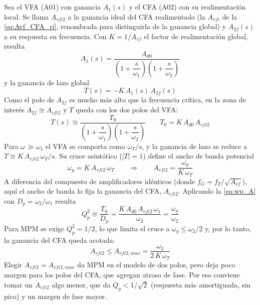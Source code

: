 Sea el VFA (A01) con ganancia $A_1(s)$ y el CFA (A02) con su realimentación local. Se llama $A_{vfi2}$ a la ganancia ideal del CFA realimentado (la $A_{vfi}$ de la \autoref{eq:Avf_CFA_ri}, renombrada para distinguirla de la ganancia global) y $A_{2f}(s)$ a su respuesta en frecuencia. Con $K = 1/A_{vf}$ el factor de realimentación global, resulta
\begin{equation}
    A_1(s) = \frac{A_{d0}}{\left(1+\dfrac{s}{\omega_1}\right)\left(1+\dfrac{s}{\omega_2}\right)}
\end{equation}
y la ganancia de lazo global
\begin{equation}
    T(s) = -K\,A_1(s)\,A_{2f}(s)
\end{equation}
Como el polo de $A_{2f}$ es mucho más alto que la frecuencia crítica, en la zona de interés $A_{2f}\cong A_{vfi2}$ y $T$ queda con los dos polos del VFA:
\begin{equation}
    T(s) \cong \frac{T_0}{\left(1+\dfrac{s}{\omega_1}\right)\left(1+\dfrac{s}{\omega_2}\right)} \qquad T_0 = K\,A_{d0}\,A_{vfi2}
\end{equation}
Para $\omega \gg \omega_1$ el VFA se comporta como $\omega_T/s$, y la ganancia de lazo se reduce a $T \cong K\,A_{vfi2}\,\omega_T/s$. Su cruce asintótico ($|T|=1$) define el ancho de banda potencial
\begin{equation}
    \omega_g = K\,A_{vfi2}\,\omega_T \qquad\Rightarrow\qquad A_{vfi2} = \frac{\omega_g}{K\,\omega_T}
    \label{eq:wg_VFACFA}
\end{equation}
A diferencia del compuesto de amplificadores idénticos (donde $f_G = f_T/\sqrt{A_{vf}}$), aquí el ancho de banda lo fija la ganancia del CFA, $A_{vfi2}$. Aplicando la \autoref{eq:wp_A} con $D_p = \omega_2/\omega_1$ resulta
\begin{equation}
    Q_p^2 \cong \frac{T_0}{D_p} = \frac{K\,A_{d0}\,A_{vfi2}\,\omega_1}{\omega_2} = \frac{\omega_g}{\omega_2}
    \label{eq:Qp_VFACFA}
\end{equation}
Para MPM se exige $Q_p^2 = 1/2$, lo que limita el cruce a $\omega_g \le \omega_2/2$ y, por lo tanto, la ganancia del CFA queda acotada:
\begin{equation}
    A_{vfi2} \le A_{vfi2,max} = \frac{\omega_2}{2\,K\,\omega_T}
    \label{eq:Avfi2_max}
\end{equation}
Elegir $A_{vfi2} = A_{vfi2,max}$ da MPM en el modelo de dos polos, pero deja poco margen para los polos del CFA, que agregan atraso de fase. Por eso conviene tomar un $A_{vfi2}$ algo menor, que da $Q_p<1/\sqrt2$ (respuesta más amortiguada, sin pico) y un margen de fase mayor.

